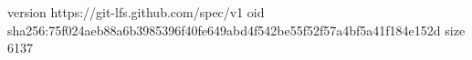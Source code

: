 version https://git-lfs.github.com/spec/v1
oid sha256:75f024aeb88a6b3985396f40fe649abd4f542be55f52f57a4bf5a41f184e152d
size 6137
